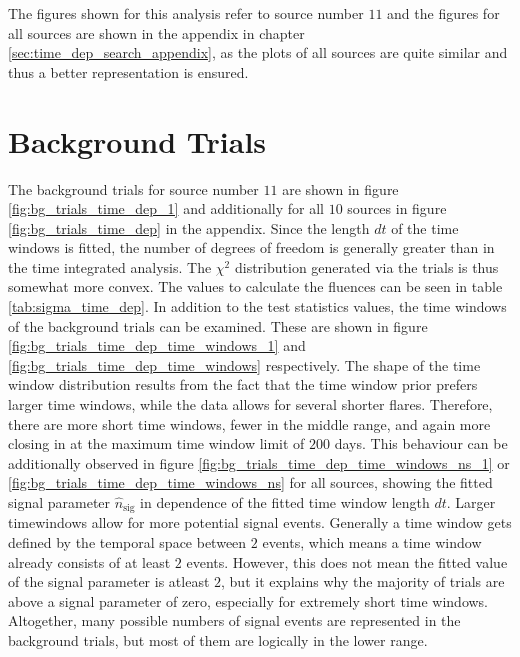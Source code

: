 The figures shown for this analysis refer to source number $\num{11}$ and the figures for all sources are shown in the appendix in chapter \ref{sec:time_dep_search_appendix}, as the plots of all sources are quite similar and thus a better representation is ensured.

\section{Background Trials}

The background trials for source number $\num{11}$ are shown in figure \ref{fig:bg_trials_time_dep_1} and additionally for all $\num{10}$ sources in figure \ref{fig:bg_trials_time_dep} in the appendix.
Since the length $dt$ of the time windows is fitted, the number of degrees of freedom is generally greater than in the time integrated analysis.
The $\chi^2$ distribution generated via the trials is thus somewhat more convex.
The values to calculate the fluences can be seen in table \ref{tab:sigma_time_dep}.
In addition to the test statistics values, the time windows of the background trials can be examined.
These are shown in figure \ref{fig:bg_trials_time_dep_time_windows_1} and \ref{fig:bg_trials_time_dep_time_windows} respectively.
The shape of the time window distribution results from the fact that the time window prior prefers larger time windows, while the data allows for several shorter flares.
Therefore, there are more short time windows, fewer in the middle range, and again more closing in at the maximum time window limit of $\num{200}$ days.
This behaviour can be additionally observed in figure \ref{fig:bg_trials_time_dep_time_windows_ns_1} or \ref{fig:bg_trials_time_dep_time_windows_ns} for all sources, showing the fitted signal parameter $\hat{n}_\text{sig}$ in dependence of the fitted time window length $dt$.
Larger timewindows allow for more potential signal events.
Generally a time window gets defined by the temporal space between $\num{2}$ events, which means a time window already consists of at least $\num{2}$ events.
However, this does not mean the fitted value of the signal parameter is atleast $2$, but it explains why the majority of trials are above a signal parameter of zero, especially for extremely short time windows.
Altogether, many possible numbers of signal events are represented in the background trials, but most of them are logically in the lower range.
